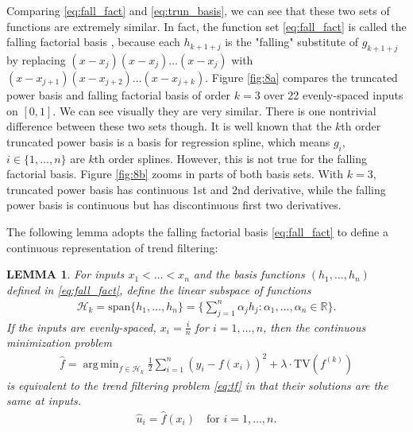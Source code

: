 \documentclass[a4paper]{article}
\DeclareMathOperator*{\argmin}{arg\,min}
\newtheorem{lemma}{LEMMA}
\newcommand{\RR}{\mathbb{R}}
\renewcommand{\cal}{\mathcal}
\begin{document}


Comparing \eqref{eq:fall_fact} and \eqref{eq:trun_basis}, we can see that these two sets of functions are extremely similar. In fact, the function set \eqref{eq:fall_fact} is called the falling factorial basis \cite{wang2014falling}, because each $h_{k+1+j}$ is the "falling" substitute of $g_{k+1+j}$ by replacing $(x-x_j)(x-x_j)\ldots(x-x_j)$ with $(x-x_{j+1})(x-x_{j+2})\ldots(x-x_{j+k})$. Figure \ref{fig:8a} compares the truncated power basis and falling factorial basis of order $k = 3$ over 22 evenly-spaced inputs on $[0, 1]$. We can see visually they are very similar. There is one nontrivial difference between these two sets though. It is well known that the $k$th order truncated power basis is a basis for regression spline, which means $g_i$, $i\in\{1,\ldots, n\}$ are $k$th order splines. However, this is not true for the falling factorial basis. Figure \ref{fig:8b} zooms in parts of both basis sets. With $k =3$, truncated power basis has continuous $1$st and $2$nd derivative, while the falling power basis is continuous but has discontinuous first two derivatives.

The following lemma adopts the falling factorial basis \eqref{eq:fall_fact} to define a continuous representation of trend filtering:
\begin{lemma}
For inputs $x_1<\ldots<x_n$ and the basis functions $(h_1,\ldots, h_n)$ defined in \eqref{eq:fall_fact}, define the linear subspace of functions
\begin{align}
\cal{H}_k = \text{span}\{h_1,\ldots, h_n\} = \Big\{\sum_{j=1}^n \alpha_jh_j:\alpha_1,\ldots, \alpha_n\in\RR\Big\}.
\label{eq:linear_class}
\end{align}
If the inputs are evenly-spaced, $x_i=\frac{i}{n}$ for $i=1,\ldots, n$, then the continuous minimization problem
\begin{align}
\hat{f} = \argmin_{f\in\cal{H}_k} \frac{1}{2}\sum_{i=1}^n(y_i-f(x_i))^2 + \lambda\cdot\text{TV}(f^{(k)})
\end{align}
is equivalent to the trend filtering problem \eqref{eq:tf} in that their solutions are the same at inputs.
\begin{align*}
\hat{u}_i = \hat{f}(x_i) \quad \text{for } i=1,\ldots,n.  
\end{align*}
\label{lemma:cont}
\end{lemma}
\end{document}
